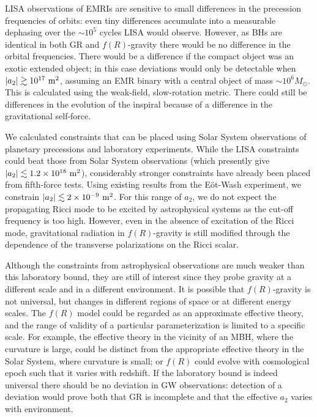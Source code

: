 LISA observations of EMRIs are sensitive to small differences in the precession frequencies of orbits: even tiny differences accumulate into a measurable dephasing over the $\sim 10^5$ cycles LISA would observe. However, as BHs are identical in both GR and $f(R)$-gravity there would be no difference in the orbital frequencies. There would be a difference if the compact object was an exotic extended object; in this case deviations would only be detectable when $|a_2| \gtrsim 10^{17}~\mathrm{m^2}$, assuming an EMR binary with a central object of mass $\sim 10^6 M_\odot$. This is calculated using the weak-field, slow-rotation metric. There could still be differences in the evolution of the inspiral because of a difference in the gravitational self-force.

We calculated constraints that can be placed using Solar System observations of planetary precessions and laboratory experiments. While the LISA constraints could beat those from Solar System observations (which presently give $|a_2| \lesssim 1.2 \times 10^{18}~\mathrm{m^2}$), considerably stronger constraints have already been placed from fifth-force tests. Using existing results from the E\"ot-Wash experiment, we constrain $|a_2| \lesssim 2 \times 10^{-9}~\mathrm{m^2}$. For this range of $a_2$, we do not expect the propagating Ricci mode to be excited by astrophysical systems as the cut-off frequency is too high. However, even in the absence of excitation of the Ricci mode, gravitational radiation in $f(R)$-gravity is still modified through the dependence of the transverse polarizations on the Ricci scalar. 

Although the constraints from astrophysical observations are much weaker than this laboratory bound, they are still of interest since they probe gravity at a different scale and in a different environment. It is possible that $f(R)$-gravity is not universal, but changes in different regions of space or at different energy scales. The $f(R)$ model could be regarded as an approximate effective theory, and the range of validity of a particular parameterization is limited to a specific scale. For example, the effective theory in the vicinity of an MBH, where the curvature is large, could be distinct from the appropriate effective theory in the Solar System, where curvature is small; or $f(R)$ could evolve with cosmological epoch such that it varies with redshift. If the laboratory bound is indeed universal there should be no deviation in GW observations: detection of a deviation would prove both that GR is incomplete and that the effective $a_2$ varies with environment.

